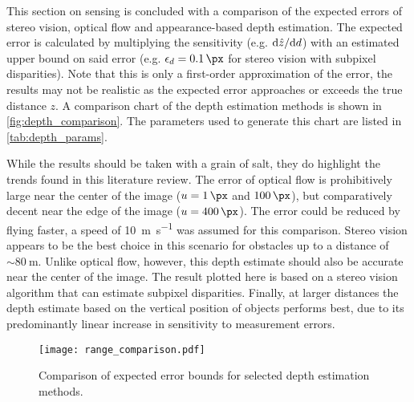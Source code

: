 \medskip

This section on sensing is concluded with a comparison of the expected errors of stereo vision, optical flow and appearance-based depth estimation.
The expected error is calculated by multiplying the sensitivity (e.g. $\mathrm{d} \hat z / \mathrm{d} d$) with an estimated upper bound on said error (e.g. $\epsilon_d=\SI{0.1}{\px}$ for stereo vision with subpixel disparities).
Note that this is only a first-order approximation of the error, the results may not be realistic as the expected error approaches or exceeds the true distance $z$.
A comparison chart of the depth estimation methods is shown in \autoref{fig:depth_comparison}.
The parameters used to generate this chart are listed in \autoref{tab:depth_params}.

While the results should be taken with a grain of salt, they do highlight the trends found in this literature review.
The error of optical flow is prohibitively large near the center of the image ($u=\SI{1}{\px}$ and $\SI{100}{\px}$), but comparatively decent near the edge of the image ($u=\SI{400}{\px}$).
The error could be reduced by flying faster, a speed of \SI{10}{\m\per\s} was assumed for this comparison.
Stereo vision appears to be the best choice in this scenario for obstacles up to a distance of $\sim\SI{80}{\m}$. Unlike optical flow, however, this depth estimate should also be accurate near the center of the image.
The result plotted here is based on a stereo vision algorithm that can estimate subpixel disparities.
Finally, at larger distances the depth estimate based on the vertical position of objects performs best, due to its predominantly linear increase in sensitivity to measurement errors.


\begin{figure}
\centering
\texttt{[image: range\_comparison.pdf]}
\caption{Comparison of expected error bounds for selected depth estimation methods.}
\label{fig:depth_comparison}
\end{figure}

